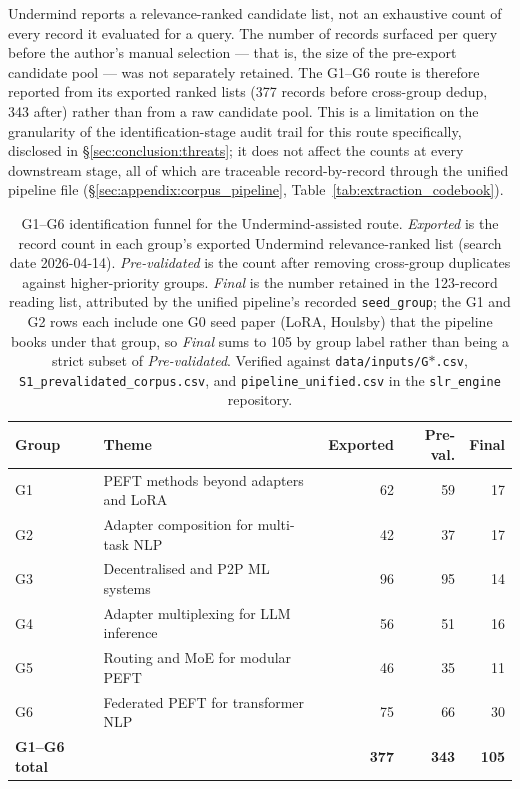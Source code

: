 Undermind reports a relevance-ranked candidate list, not an exhaustive count
of every record it evaluated for a query. The number of records surfaced per
query before the author's manual selection --- that is, the size of the
pre-export candidate pool --- was not separately retained. The G1--G6 route
is therefore reported from its exported ranked lists (377 records before
cross-group dedup, 343 after) rather than from a raw candidate pool. This is
a limitation on the granularity of the identification-stage audit trail for
this route specifically, disclosed in \S\ref{sec:conclusion:threats}; it does
not affect the counts at every downstream stage, all of which are traceable
record-by-record through the unified pipeline file
(\S\ref{sec:appendix:corpus_pipeline}, Table~\ref{tab:extraction_codebook}).

\begin{table}[H]
\centering
\caption{G1--G6 identification funnel for the Undermind-assisted route.
\emph{Exported} is the record count in each group's exported Undermind
relevance-ranked list (search date 2026-04-14). \emph{Pre-validated} is the
count after removing cross-group duplicates against higher-priority groups.
\emph{Final} is the number retained in the 123-record reading list, attributed
by the unified pipeline's recorded \texttt{seed\_group}; the G1 and G2 rows
each include one G0 seed paper (LoRA, Houlsby) that the pipeline books under
that group, so \emph{Final} sums to 105 by group label rather than being a
strict subset of \emph{Pre-validated}. Verified against
\texttt{data/inputs/G$\ast$.csv}, \texttt{S1\_prevalidated\_corpus.csv}, and
\texttt{pipeline\_unified.csv} in the \texttt{slr\_engine} repository.}
\label{tab:undermind_funnel}
\begin{tabular}{lp{5.2cm}rrr}
\toprule
\textbf{Group} & \textbf{Theme} & \textbf{Exported} & \textbf{Pre-val.} & \textbf{Final} \\
\midrule
G1 & PEFT methods beyond adapters and LoRA  & 62  & 59  & 17 \\
G2 & Adapter composition for multi-task NLP & 42  & 37  & 17 \\
G3 & Decentralised and P2P ML systems       & 96  & 95  & 14 \\
G4 & Adapter multiplexing for LLM inference & 56  & 51  & 16 \\
G5 & Routing and MoE for modular PEFT       & 46  & 35  & 11 \\
G6 & Federated PEFT for transformer NLP     & 75  & 66  & 30 \\
\midrule
\textbf{G1--G6 total} & & \textbf{377} & \textbf{343} & \textbf{105} \\
\bottomrule
\end{tabular}
\end{table}

